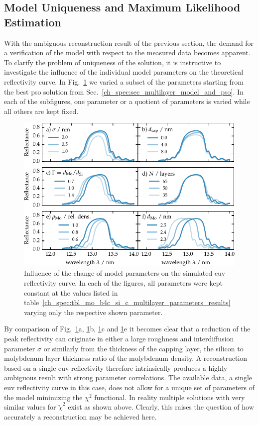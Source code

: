\subsection{Model Uniqueness and Maximum Likelihood Estimation}  \label{ch_spec:sec_maximum_likelihood}
With the ambiguous reconstruction result of the previous section, the demand for a verification of the model with respect to the measured data becomes apparent. To clarify the problem of uniqueness of the solution, it is instructive to investigate the influence of the individual model parameters on the theoretical reflectivity curve. In Fig.~\ref{ch_spec:fig_mo_si_parameter_influence} we varied a subset of the parameters starting from the best \gls{pso} solution from Sec.~\ref{ch_spec:sec_multilayer_model_and_pso}. In each of the subfigures, one parameter or a quotient of parameters is varied while all others are kept fixed.
\begin{figure}[htbp]
\centering
\includegraphics{img/parameter_influence}
\caption[Influence of the change of model parameters on the simulated EUV reflectivity curve.]{Influence of the change of model parameters on the simulated \gls{euv} reflectivity curve. In each of the figures, all parameters were kept constant at the values listed in table~\ref{ch_spec:tbl_mo_b4c_si_c_multilayer_parameters_results} varying only the respective shown parameter.}
\label{ch_spec:fig_mo_si_parameter_influence}
\end{figure}
By comparison of Fig.~\ref{ch_spec:fig_mo_si_parameter_influence}a, \ref{ch_spec:fig_mo_si_parameter_influence}b, \ref{ch_spec:fig_mo_si_parameter_influence}c and \ref{ch_spec:fig_mo_si_parameter_influence}e it becomes clear that a reduction of the peak reflectivity can originate in either a large roughness and interdiffusion parameter $\sigma$ or similarly from the thickness of the capping layer, the silicon to molybdenum layer thickness ratio of the molybdenum density. A reconstruction based on a single \gls{euv} reflectivity therefore intrinsically produces a highly ambiguous result with strong parameter correlations. The available data, a single \gls{euv} reflectivity curve in this case, does not allow for a unique set of parameters of the model minimizing the $\chi^2$ functional. In reality multiple solutions with very similar values for $\tilde{\chi}^2$ exist as shown above. Clearly, this raises the question of how accurately a reconstruction may be achieved here.

